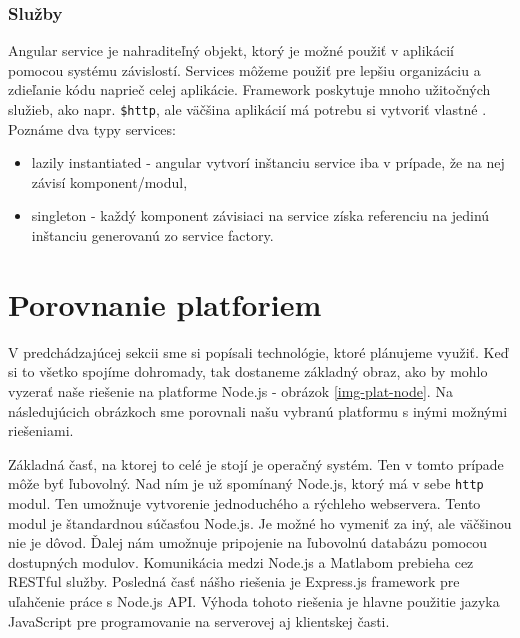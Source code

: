 \subsubsection{Služby}
Angular service je nahraditeľný objekt, ktorý je možné použiť v aplikácií pomocou systému závislostí. Services môžeme použiť pre lepšiu organizáciu a zdieľanie kódu naprieč celej aplikácie. Framework poskytuje mnoho užitočných služieb, ako napr. \verb|$http|, ale väčšina aplikácií má potrebu si vytvoriť vlastné \cite{angular-docs}.
Poznáme dva typy services:
\begin{itemize}
\item lazily instantiated - angular vytvorí inštanciu service iba v prípade, že na nej závisí komponent/modul,
\item singleton - každý komponent závisiaci na service získa referenciu na jedinú inštanciu generovanú zo service factory.
\end{itemize}


\section{Porovnanie platforiem}

V predchádzajúcej sekcii sme si popísali technológie, ktoré plánujeme využiť. Keď si to všetko spojíme dohromady, tak dostaneme základný obraz, ako by mohlo vyzerať naše riešenie na platforme Node.js - obrázok \ref{img-plat-node}. Na následujúcich obrázkoch sme porovnali našu vybranú platformu s inými možnými riešeniami.

Základná časť, na ktorej to celé je stojí je operačný systém. Ten v tomto prípade môže byť ľubovolný. Nad ním je už spomínaný Node.js, ktorý má v sebe \verb|http| modul. Ten umožnuje vytvorenie jednoduchého a rýchleho webservera. Tento modul je štandardnou súčasťou Node.js. Je možné ho vymeniť za iný, ale väčšinou nie je dôvod. Ďalej nám umožnuje pripojenie na ľubovolnú databázu pomocou dostupných modulov. Komunikácia medzi Node.js a Matlabom prebieha cez RESTful služby. Posledná časť nášho riešenia je Express.js framework pre uľahčenie práce s Node.js API. Výhoda tohoto riešenia je hlavne použitie jazyka JavaScript pre programovanie na serverovej aj klientskej časti.

